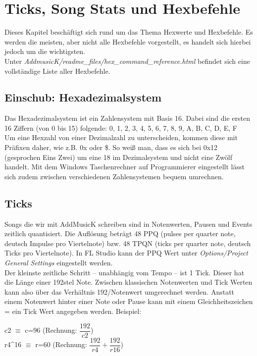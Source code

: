 \section{Ticks, Song Stats und Hexbefehle}

Dieses Kapitel beschäftigt sich rund um das Thema Hexwerte und Hexbefehle. Es werden die meisten, aber nicht alle Hexbefehle vorgestellt, es handelt sich hierbei jedoch um die wichtigsten. \\
Unter \textit{AddmusicK/readme\_files/hex\_command\_reference.html} befindet sich eine vollständige Liste aller Hexbefehle.

\subsection*{Einschub: Hexadezimalsystem}

Das Hexadezimalsystem ist ein Zahlensystem mit Basis 16. Dabei sind die ersten 16 Ziffern (von 0 bis 15) folgende:
0, 1, 2, 3, 4, 5, 6, 7, 8, 9, A, B, C, D, E, F \\

Um eine Hexzahl von einer Dezimalzahl zu unterscheiden, kommen diese mit Präfixen daher, wie z.B. 0x oder \$. So weiß man, dass es sich bei 0x12 (gesprochen Eins Zwei) um eine 18 im Dezimalsystem und nicht eine Zwölf handelt. Mit dem Windows Taschenrechner auf Programmierer eingestellt lässt sich zudem zwischen verschiedenen Zahlensystemen bequem umrechnen.


\subsection{Ticks}

Songs die wir mit AddMusicK schreiben sind in Notenwerten, Pausen und Events zeitlich quantisiert.
Die Auflösung beträgt 48 PPQ (pulses per quarter note, deutsch Impulse pro Viertelnote) bzw. 48 TPQN (ticks per quarter note, deutsch Ticks pro Viertelnote). In FL Studio kann der PPQ Wert unter \textit{Options/Project General Settings} eingestellt werden.\\
Der kleinste zeitliche Schritt -- unabhängig vom Tempo -- ist 1 Tick. Dieser hat die Länge einer 192stel Note. Zwischen klassischen Notenwerten und Tick Werten kann also über das Verhältnis 192/Notenwert umgerechnet werden. Anstatt einem Notenwert hinter einer Note oder Pause kann mit einem Gleichheitszeichen = ein Tick Wert angegeben werden. Beispiel:

\bigskip

c2 $ \equiv $ c=96 (Rechnung: $ \dfrac{192}{c2} $)\\
r4\textasciicircum16 $ \equiv $ r=60 (Rechnung: $ \dfrac{192}{r4} +  \dfrac{192}{r16} $)\\

